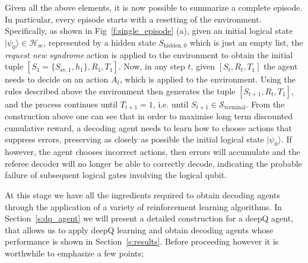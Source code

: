 \documentclass[twocolumn,preprintnumbers,amsmath,amssymb,notitlepage,nofootinbib,longbibliography,superscriptaddress,aps,pra,10pt]{revtex4-1}
\begin{document}
	Given all the above elements, it is now possible to summarize a complete episode.
	In particular, every episode starts with a resetting of the environment.
	Specifically, as shown in Fig~\ref{f:single_episode} (a), given an initial logical state $|\psi_0\rangle \in \mathcal{H}_{\mathrm{sc}}$, represented by a hidden state $S_{\mathrm{hidden},0}$ which is just an empty list, the \emph{request new syndrome} action is applied to the environment to obtain the initial tuple $[S_{1} = \{S_{\mathrm{sv},1},h_{1}\},R_{1},T_{1}]$.
	Now, in any step $t$, given $[S_{t},R_{t},T_{1}]$ the agent needs to decide on an action $A_t$, which is applied to the environment.
	Using the rules described above the environment then generates the tuple $[S_{t+1},R_{t},T_{1}]$, and the process continues until $T_{t+1} = 1$, i.e. until $S_{t+1} \in \mathcal{S}_\mathrm{terminal}$.
	From the construction above one can see that in order to maximise long term discounted cumulative reward, a decoding agent needs to learn how to choose actions that suppress errors, preserving as closely as possible the initial logical state $|\psi_0\rangle$.
	If however, the agent chooses incorrect actions, then errors will accumulate and the referee decoder will no longer be able to correctly decode, indicating the probable failure of subsequent logical gates involving the logical qubit.

	At this stage we have all the ingredients required to obtain decoding agents through the application of a variety of reinforcement learning algorithms.
	In Section~\ref{s:dq_agent} we will present a detailed construction for a deepQ agent, that allows us to apply deepQ learning and obtain decoding agents whose performance is shown in Section~\ref{s:results}.
	Before proceeding however it is worthwhile to emphasize a few points;
\end{document}
